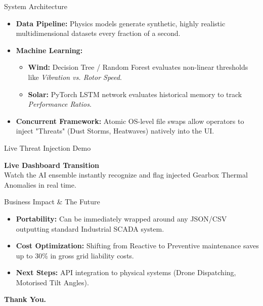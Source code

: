 \documentclass[aspectratio=169]{beamer}
\begin{document}
\begin{frame}{System Architecture}
    \begin{itemize}
        \item \textbf{Data Pipeline:} Physics models generate synthetic, highly realistic multidimensional datasets every fraction of a second.
        \item \textbf{Machine Learning:} 
        \begin{itemize}
            \item \textbf{Wind:} Decision Tree / Random Forest evaluates non-linear thresholds like \textit{Vibration vs. Rotor Speed}.
            \item \textbf{Solar:} PyTorch LSTM network evaluates historical memory to track \textit{Performance Ratios}.
        \end{itemize}
        \item \textbf{Concurrent Framework:} Atomic OS-level file swaps allow operators to inject "Threats" (Dust Storms, Heatwaves) natively into the UI.
    \end{itemize}
\end{frame}

\begin{frame}{Live Threat Injection Demo}
    \begin{center}
        \Large \textbf{Live Dashboard Transition}
        \vspace{0.5cm} \\
        \normalsize Watch the AI ensemble instantly recognize and flag injected Gearbox Thermal Anomalies in real time.
    \end{center}
\end{frame}

\begin{frame}{Business Impact \& The Future}
    \begin{itemize}
        \item \textbf{Portability:} Can be immediately wrapped around any JSON/CSV outputting standard Industrial SCADA system.
        \item \textbf{Cost Optimization:} Shifting from Reactive to Preventive maintenance saves up to 30\% in gross grid liability costs.
        \item \textbf{Next Steps:} API integration to physical systems (Drone Dispatching, Motorised Tilt Angles).
    \end{itemize}
    \vspace{0.5cm}
    \begin{center}
        \textbf{Thank You.}
    \end{center}
\end{frame}
\end{document}

